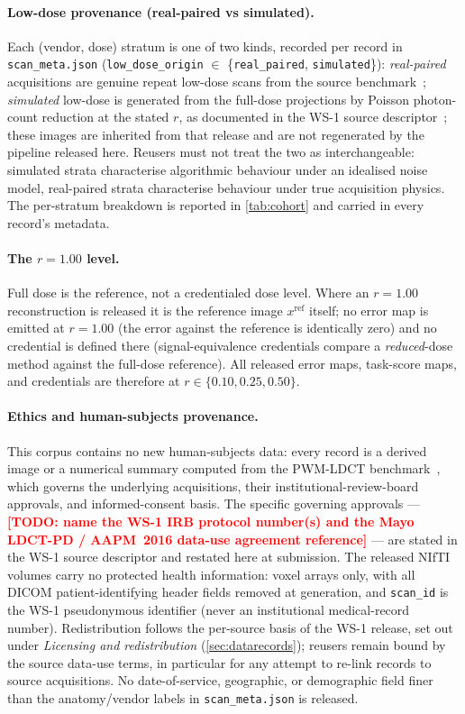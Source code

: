 \documentclass{article}
\newcommand{\todo}[1]{\textcolor{red}{\textbf{[TODO: #1]}}}
\begin{document}
\paragraph{Low-dose provenance (real-paired vs simulated).} Each
(vendor, dose) stratum is one of two kinds, recorded per record in
\texttt{scan\_meta.json} (\texttt{low\_dose\_origin} $\in$
\{\texttt{real\_paired}, \texttt{simulated}\}): \emph{real-paired}
acquisitions are genuine repeat low-dose scans from the source
benchmark~\citep{ws1dataset}; \emph{simulated} low-dose is generated from
the full-dose projections by Poisson photon-count reduction at the stated
$r$, as documented in the WS-1 source descriptor~\citep{ws1dataset}; these
images are inherited from that release and are not regenerated by the
pipeline released here. Reusers
must not treat the two as interchangeable: simulated strata characterise
algorithmic behaviour under an idealised noise model, real-paired strata
characterise behaviour under true acquisition physics. The per-stratum
breakdown is reported in \autoref{tab:cohort} and carried in every
record's metadata.

\paragraph{The $r = 1.00$ level.} Full dose is the reference, not a
credentialed dose level. Where an $r = 1.00$ reconstruction is released it
is the reference image $x^{\textrm{ref}}$ itself; no error map is emitted
at $r = 1.00$ (the error against the reference is identically zero) and no
credential is defined there (signal-equivalence credentials compare a
\emph{reduced}-dose method against the full-dose reference). All released
error maps, task-score maps, and credentials are therefore at $r \in
\{0.10, 0.25, 0.50\}$.

\paragraph{Ethics and human-subjects provenance.} This corpus contains no
new human-subjects data: every record is a derived image or a numerical
summary computed from the PWM-LDCT benchmark~\citep{ws1dataset}, which
governs the underlying acquisitions, their institutional-review-board
approvals, and informed-consent basis. The specific governing approvals ---
\todo{name the WS-1 IRB protocol number(s) and the Mayo LDCT-PD / AAPM~2016
data-use agreement reference} --- are stated in the WS-1 source descriptor and
restated here at submission. The released NIfTI volumes carry no
protected health information: voxel arrays only, with all DICOM
patient-identifying header fields removed at generation, and
\texttt{scan\_id} is the WS-1 pseudonymous identifier (never an
institutional medical-record number). Redistribution follows the
per-source basis of the WS-1 release, set out under
\emph{Licensing and redistribution} (\autoref{sec:datarecords}); reusers
remain bound by the source data-use terms, in particular for any attempt
to re-link records to source acquisitions. No date-of-service, geographic,
or demographic field finer than the anatomy/vendor labels in
\texttt{scan\_meta.json} is released.
\end{document}
